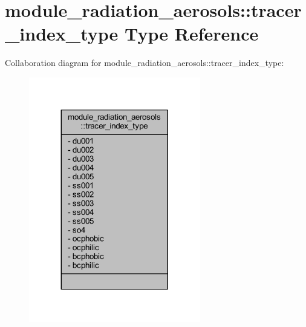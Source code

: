 \hypertarget{structmodule__radiation__aerosols_1_1tracer__index__type}{}\section{module\+\_\+radiation\+\_\+aerosols\+:\+:tracer\+\_\+index\+\_\+type Type Reference}
\label{structmodule__radiation__aerosols_1_1tracer__index__type}


Collaboration diagram for module\+\_\+radiation\+\_\+aerosols\+:\+:tracer\+\_\+index\+\_\+type\+:
\nopagebreak
\begin{figure}[H]
\begin{center}
\leavevmode
\includegraphics[width=212pt]{structmodule__radiation__aerosols_1_1tracer__index__type__coll__graph}
\end{center}
\end{figure}
